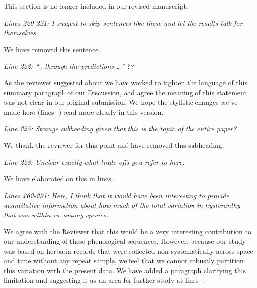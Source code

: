 \documentclass{article}[12pt]
\begin{document}
This section is no longer included in our revised manuscript.

\emph{Lines 220-221: I suggest to skip sentences like these and let the results talk for themselves.}

We have removed this sentence.

\emph{Line 222: “.. through the predictions …” ??}

As the reviewer suggested about we have worked to tighten the language of this summary paragraph of our Discussion, and agree the meaning of this statement was not clear in our original submission. We hope the stylistic changes we've made here (lines -) read more clearly in this version.

\emph{Line 225: Strange subheading given that this is the topic of the entire paper?}

We thank the reviewer for this point and have removed this subheading.

\emph{Line 228: Unclear exactly what trade-offs you refer to here.}

We have elaborated on this in lines .

\emph{Lines 262-291: Here, I think that it would have been interesting to provide quantitative information about how much of the total variation in hysteranthy that was within vs. among species.}

We agree with the Reviewer that this would be a very interesting contribution to our understanding of these phenological sequences. However, because our study was based on herbaria records that were collected non-systematically across space and time without any repeat sample, we feel that we cannot robustly partition this variation with the present data. We have added a paragraph clarifying this limitation and suggesting it as an area for further study at lines -.  

 
\end{document}
